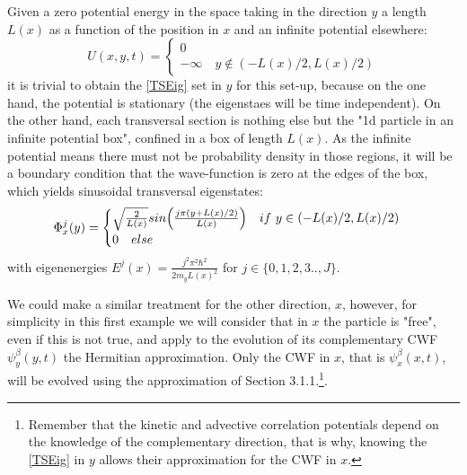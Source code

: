 \documentclass[11pt, a4paper]{article} %
\begin{document}
Given a zero potential energy in the space taking in the direction $y$ a length $L(x)$ as a function of the position in $x$ and an infinite potential elsewhere:
$$
U(x,y,t)=\begin{cases}
0\quad  \\
-\infty\quad y\notin (-L(x)/2, L(x)/2)
\end{cases}
$$
it is trivial to obtain the \ref{TSEig} set in $y$ for this set-up, because on the one hand, the potential is stationary (the eigenstaes will be time independent). On the other hand, each transversal section is nothing else but the "1d particle in an infinite potential box", confined in a box of length $L(x)$. As the infinite potential means there must not be probability density in those regions, it will be a boundary condition that the wave-function is zero at the edges of the box, which yields sinusoidal transversal eigenstates:
$$
\Phi^j_{x}(y)=\begin{cases} \sqrt{\frac{2}{L(x)}}sin\qty( \frac{j\pi (y+L(x)/2)}{L(x)} )\quad if\ y\in(-L(x)/2, L(x)/2)\\0\quad else\end{cases}
$$ 
with eigenenergies $E^j(x)=\frac{j^2\pi^2 \hbar^2}{2m_y L(x)^2}$ for $j \in\{0,1,2,3..,J\}$.


We could make a similar treatment for the other direction, $x$, however, for simplicity in this first example we will consider that in $x$ the particle is "free", even if this is not true, and apply to the evolution of its complementary CWF $\psi^\beta_y(y,t)$ the Hermitian approximation. Only the CWF in $x$, that is $\psi^\beta_x(x,t)$, will be evolved using the approximation of Section 3.1.1.\footnote{Remember that the kinetic and advective correlation potentials depend on the knowledge of the complementary direction, that is why, knowing the \ref{TSEig} in $y$ allows their approximation for the CWF in $x$.}.
\end{document}
